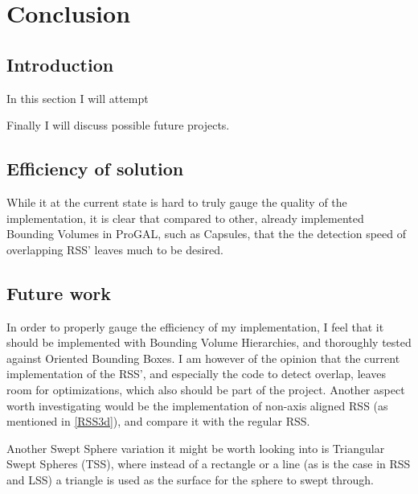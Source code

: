 
\section{Conclusion}
\label{conclusion}
\subsection{Introduction}
In this section I will attempt 

Finally I will discuss possible future projects.

\subsection{Efficiency of solution}
While it at the current state is hard to truly gauge the quality of the implementation, it is clear that compared to other, already implemented Bounding Volumes in ProGAL, such as Capsules, that the the detection speed of overlapping RSS' leaves much to be desired.

\subsection{Future work}
In order to properly gauge the efficiency of my implementation, I feel that it should be implemented with Bounding Volume Hierarchies, and thoroughly tested against Oriented Bounding Boxes. I am however of the opinion that the current implementation of the RSS', and especially the code to detect overlap, leaves room for optimizations, which also should be part of the project. Another aspect worth investigating would be the implementation of non-axis aligned RSS (as mentioned in \ref{RSS3d}), and compare it with the regular RSS.

Another Swept Sphere variation it might be worth looking into is Triangular Swept Spheres (TSS), where instead of a rectangle or a line (as is the case in RSS and LSS) a triangle is used as the surface for the sphere to swept through.

